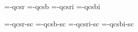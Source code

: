 

\ifx\sizespec\undefined \def\sizespec{}\fi
\ifx\font\corkencoded {}\else {}\fi

\ifx\font\unicoded  {} 
\else

\font\tenrm=\tmp-qcsr  \sizespec
\font\tenbf=\tmp-qcsb  \sizespec
\font\tenit=\tmp-qcsri \sizespec
\font\tenbi=\tmp-qcsbi \sizespec

\font\tenrmc=\tmp-qcsr-sc  \sizespec
\font\tenbfc=\tmp-qcsb-sc  \sizespec
\font\tenitc=\tmp-qcsri-sc \sizespec
\font\tenbic=\tmp-qcsbi-sc \sizespec

\fi

\tenrm

\def\caps#1{{\escapechar=-1 \expandafter}%
  \expandafter\csname\expandafter\tenonlytext\string#1c\endcsname}
\def\tenonlytext{ten}

\ifx\font\corkencoded \else  \fi

\ifx\normalTXmath\undefined  \else\normalTXmath \fi


